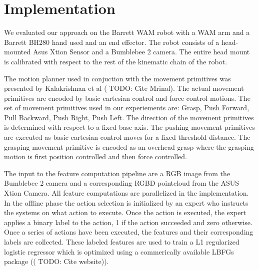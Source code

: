 \section{Implementation}
\label{sec:experiments}
We evaluated our approach on the Barrett WAM robot with a WAM arm and a Barrett BH280 hand used and an end effector. The robot consists of a head-mounted Asus Xtion Sensor and a Bumblebee 2 camera. The entire head mount is calibrated with respect to the rest of the kinematic chain of the robot.

The motion planner used in conjuction with the movement primitives was presented by Kalakrishnan et al (\cite{Javidi12_Journal} TODO: Cite Mrinal). The actual movement primitives are encoded by basic cartesian control and force control motions. The set of movement primitives used in our experiements are: Grasp, Push Forward, Pull Backward, Push Right, Push Left.
The direction of the movement primitives is determined with respect to a fixed base axis. The pushing movement primitives are executed as basic cartesian control moves for a fixed threshold distance. The grasping movement primitive is encoded as an overhead grasp where the grasping motion is first position controlled and then force controlled. 

The input to the feature computation pipeline are a RGB image from the Bumblebee 2 camera and a corresponding RGBD pointcloud from the ASUS Xtion Camera. All feature computations are parallelized in the implementation. In the offline phase the action selection is initialized by an expert who instructs the systems on what action to execute. Once the action is executed, the expert applies a binary label to the action, 1 if the action succeeded and zero otherwise. Once a series of actions have been executed, the features and their corresponding labels are collected.
These labeled features are used to train a L1 regularized logistic regressor which is optimized using a commerically available LBFGs package ((\cite{Javidi12_Journal} TODO: Cite website)).


